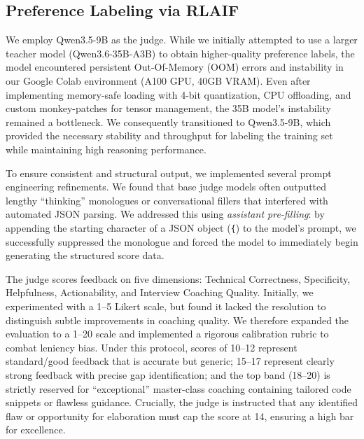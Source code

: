 \documentclass[10pt,twocolumn,letterpaper]{article}
\begin{document}
\subsection{Preference Labeling via RLAIF}
We employ Qwen3.5-9B as the judge. While we initially attempted to use a larger teacher model (Qwen3.6-35B-A3B) to obtain higher-quality preference labels, the model encountered persistent Out-Of-Memory (OOM) errors and instability in our Google Colab environment (A100 GPU, 40GB VRAM). Even after implementing memory-safe loading with 4-bit quantization, CPU offloading, and custom monkey-patches for tensor management, the 35B model's instability remained a bottleneck. We consequently transitioned to Qwen3.5-9B, which provided the necessary stability and throughput for labeling the training set while maintaining high reasoning performance. 

To ensure consistent and structural output, we implemented several prompt engineering refinements. We found that base judge models often outputted lengthy ``thinking'' monologues or conversational fillers that interfered with automated JSON parsing. We addressed this using \emph{assistant pre-filling}: by appending the starting character of a JSON object (\texttt{\{}) to the model's prompt, we successfully suppressed the monologue and forced the model to immediately begin generating the structured score data. 

The judge scores feedback on five dimensions: Technical Correctness, Specificity, Helpfulness, Actionability, and Interview Coaching Quality. Initially, we experimented with a 1--5 Likert scale, but found it lacked the resolution to distinguish subtle improvements in coaching quality. We therefore expanded the evaluation to a 1--20 scale and implemented a rigorous calibration rubric to combat leniency bias. Under this protocol, scores of 10--12 represent standard/good feedback that is accurate but generic; 15--17 represent clearly strong feedback with precise gap identification; and the top band (18--20) is strictly reserved for ``exceptional'' master-class coaching containing tailored code snippets or flawless guidance. Crucially, the judge is instructed that any identified flaw or opportunity for elaboration must cap the score at 14, ensuring a high bar for excellence. 
\end{document}
